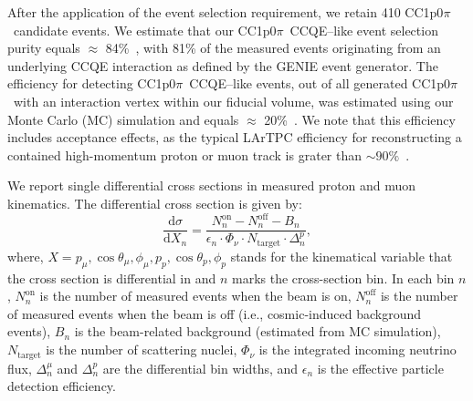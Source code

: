\documentclass[aps,prl,showpacs,twocolumn,superscriptaddress,letterpaper,longbibliography]{revtex4-1}
\newcommand{\CCIpOpi}{CC1p0$\pi$}
\begin{document}
After the application of the event selection requirement, we retain 410 \CCIpOpi\ candidate events.
We estimate that our \CCIpOpi\ CCQE--like event selection purity equals $\approx$ 84\%~\cite{Adams:2018lzd},
with 81\% of the measured events originating from an underlying CCQE interaction as defined by the GENIE event generator.
The efficiency for detecting \CCIpOpi\ CCQE--like events, out of all generated \CCIpOpi\ with an interaction vertex within our fiducial volume, was estimated using our Monte Carlo (MC) simulation and equals $\approx$ 20\%~\cite{Adams:2018lzd}.
We note that this efficiency includes acceptance effects, as the typical LArTPC efficiency for reconstructing a contained high-momentum proton or muon track is grater than $\sim 90\%$~\cite{Acciarri:2017hat}.



We report single differential cross sections in measured proton and muon kinematics. 
The differential cross section is given by:
\begin{equation}
\label{eq:Xsec}
	\frac{\mathrm{d}\sigma}
	{\mathrm{d}X_n }
	=
	\frac{N^\textrm{on}_n - N^\textrm{off}_n - B_{n}}{ \epsilon_{n} \cdot \Phi_\nu \cdot N_{\textrm{target}} \cdot \Delta^p_{n}},
\end{equation}
where, $X = p_\mu,  \cos\theta_\mu, \phi_\mu,  p_p,  \cos\theta_p, \phi_p$ stands for the kinematical variable that the cross section is differential in and $n$ marks the cross-section bin.
In each bin $n$, $N_n^\textrm{on}$ is the number of measured events when the beam is on,
$N_n^\textrm{off}$ is the number of measured events when the beam is off (i.e., cosmic-induced background events),
$B_n$ is the beam-related background (estimated from MC simulation), $N_{\textrm{target}}$ is the number of scattering nuclei,
$\Phi_\nu$ is the integrated incoming neutrino flux,
$\Delta^\mu_{n}$ and $\Delta^p_{n}$ are the differential bin widths, 
and $\epsilon_{n}$ is the effective particle detection efficiency.
\end{document}
